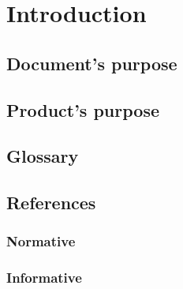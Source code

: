 \section{Introduction}

\subsection{Document's purpose}

\subsection{Product's purpose}
\ScopoDelProdottoEng

\subsection{Glossary}

\subsection{References}
\subsubsection{Normative}
\subsubsection{Informative}
